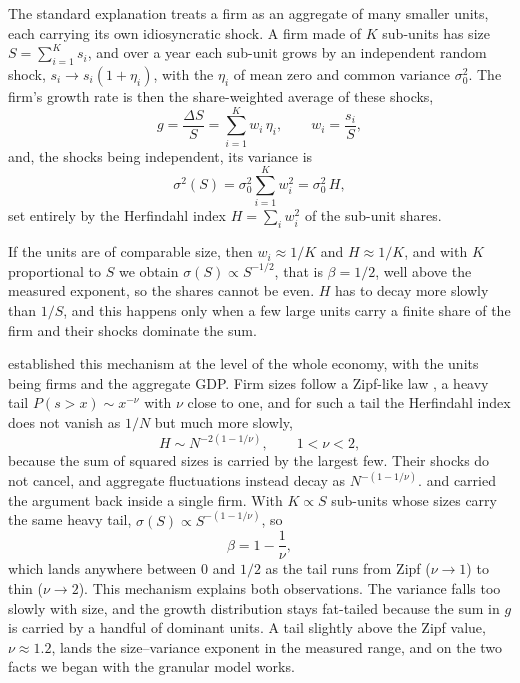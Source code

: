 The standard explanation treats a firm as an aggregate of many smaller units, each carrying
its own idiosyncratic shock. A firm made of $K$ sub-units has size
$S = \sum_{i=1}^{K} s_i$, and over a year each sub-unit grows by an
independent random shock, $s_i \to s_i(1 + \eta_i)$, with the $\eta_i$ of mean zero and common
variance $\sigma_0^2$. The firm's growth rate is then the share-weighted average of these
shocks,
\begin{equation}
  g = \frac{\Delta S}{S} = \sum_{i=1}^{K} w_i\, \eta_i,
  \qquad w_i = \frac{s_i}{S},
\end{equation}
and, the shocks being independent, its variance is
\begin{equation}
  \sigma^2(S) = \sigma_0^2 \sum_{i=1}^{K} w_i^2 = \sigma_0^2\, H,
\end{equation}
set entirely by the Herfindahl index $H = \sum_i w_i^2$ of the sub-unit shares.

If the units are of comparable
size, then $w_i \approx 1/K$ and $H \approx 1/K$, and with $K$ proportional to
$S$ we obtain $\sigma(S) \propto S^{-1/2}$, that is $\beta = 1/2$, well above the measured
exponent, so the shares cannot be even. $H$ has to decay more slowly than $1/S$,
and this happens only when a few large units carry a finite share of the firm and their shocks
dominate the sum.

\citet{gabaix2011} established this mechanism at the level of the whole economy, with the
units being firms and the aggregate GDP. Firm sizes follow a
Zipf-like law \citep{axtell2001}, a heavy tail $P(s > x) \sim x^{-\nu}$ with $\nu$ close to one, and for such a
tail the Herfindahl index does not vanish as $1/N$ but much more slowly,
\begin{equation}
  H \sim N^{-2\left(1 - 1/\nu\right)}, \qquad 1 < \nu < 2,
\end{equation}
because the sum of squared sizes is carried by the largest few. Their shocks do not cancel,
and aggregate fluctuations instead decay as $N^{-(1 - 1/\nu)}$.
\citet{sutton2002} and \citet{wyartbouchaud2003} carried the argument back inside a single
firm. With $K \propto S$ sub-units whose sizes carry the same heavy tail,
$\sigma(S) \propto S^{-(1 - 1/\nu)}$, so
\begin{equation}
  \beta = 1 - \frac{1}{\nu},
  \label{eq:intro-beta-nu}
\end{equation}
which lands anywhere between $0$ and $1/2$ as the tail runs from Zipf ($\nu \to 1$) to thin
($\nu \to 2$). This mechanism explains both observations. The variance falls too slowly with
size, and the growth distribution stays fat-tailed because the sum in $g$ is carried by a
handful of dominant units. A tail slightly
above the Zipf value, $\nu \approx 1.2$, lands the size--variance exponent in the
measured range, and on the two facts we began with the granular model works.

